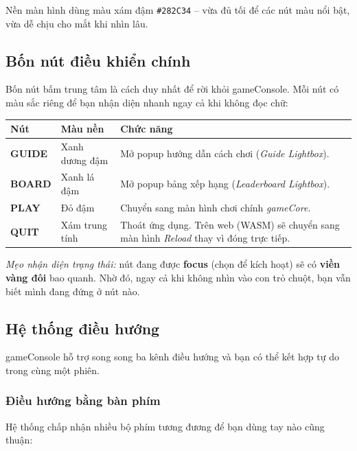 \documentclass[12pt,a4paper]{article}
\begin{document}
\noindent Nền màn hình dùng màu xám đậm \texttt{\#282C34} -- vừa đủ tối để các nút màu nổi bật, vừa dễ chịu cho mắt khi nhìn lâu.

\subsection{Bốn nút điều khiển chính}
Bốn nút bấm trung tâm là cách duy nhất để rời khỏi gameConsole.
Mỗi nút có màu sắc riêng để bạn nhận diện nhanh ngay cả khi không đọc chữ:

\vspace{4pt}
\begin{tabularx}{\linewidth}{|l|l|X|}
    \hline
    \textbf{Nút} & \textbf{Màu nền} & \textbf{Chức năng} \\
    \hline
    \textbf{GUIDE} & Xanh dương đậm & Mở popup hướng dẫn cách chơi (\textit{Guide Lightbox}). \\
    \hline
    \textbf{BOARD} & Xanh lá đậm   & Mở popup bảng xếp hạng (\textit{Leaderboard Lightbox}). \\
    \hline
    \textbf{PLAY}  & Đỏ đậm        & Chuyển sang màn hình chơi chính \textit{gameCore}. \\
    \hline
    \textbf{QUIT}  & Xám trung tính & Thoát ứng dụng. Trên web (WASM) sẽ chuyển sang màn hình \textit{Reload} thay vì đóng trực tiếp. \\
    \hline
\end{tabularx}

\vspace{4pt}
\noindent\textit{Mẹo nhận diện trạng thái:} nút đang được \textbf{focus} (chọn để kích hoạt) sẽ có \textbf{viền vàng đôi} bao quanh.
Nhờ đó, ngay cả khi không nhìn vào con trỏ chuột, bạn vẫn biết mình đang đứng ở nút nào.

\subsection{Hệ thống điều hướng}
gameConsole hỗ trợ song song ba kênh điều hướng và bạn có thể kết hợp tự do trong cùng một phiên.

\subsubsection{Điều hướng bằng bàn phím}
Hệ thống chấp nhận nhiều bộ phím tương đương để bạn dùng tay nào cũng thuận:
\end{document}
